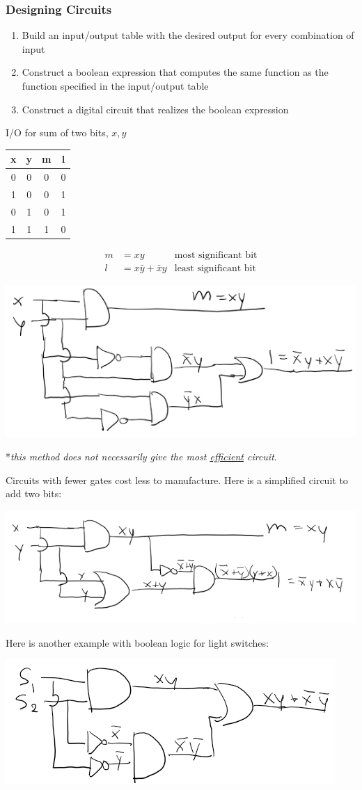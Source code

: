 \subsubsection*{Designing Circuits}

\begin{enumerate}
  \item Build an input/output table with the desired output for every combination of input
  \item Construct a boolean expression that computes the same function as the function specified in the input/output table
  \item Construct a digital circuit that realizes the boolean expression
\end{enumerate}

I/O for sum of two bits, $x,y$
\begin{center}
  \begin{tabular}{cccc}
    x & y & m & l \\
    \hline
    0 & 0 & 0 & 0 \\
    1 & 0 & 0 & 1 \\
    0 & 1 & 0 & 1 \\
    1 & 1 & 1 & 0 \\
  \end{tabular}
\end{center}
\begin{align*}
  m & = xy                  & \text{most significant bit}  \\
  l & = x\bar{y} + \bar{x}y & \text{least significant bit}
\end{align*}
\begin{center}
  \includegraphics[width=.6\linewidth]{resources/sum_of_two_bits.png}
\end{center}
\begin{center}
  *\textit{this method does not necessarily give the most \underline{efficient} circuit}.
\end{center}
Circuits with fewer gates cost less to manufacture. Here is a simplified circuit to add two bits:
\begin{center}
  \includegraphics[width=.6\linewidth]{resources/better_sum_of_two_bits.png}
\end{center}

Here is another example with boolean logic for light switches:
\begin{center}
  \includegraphics[width=.6\linewidth]{resources/switches.png}
\end{center}